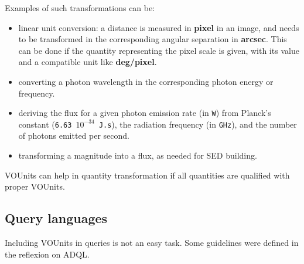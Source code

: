 \documentclass[11pt,notitlepage,onecolumn]{ivoa}
\newcommand{\unit}[1]{\textbf{\textsf{\color{orange}#1}}}
\begin{document}
Examples of such transformations can be:
\begin{itemize}
\item linear unit conversion: a distance is measured in \unit{pixel} in an image, and needs to be transformed in
the corresponding angular separation in \unit{arcsec}. This can be done if the quantity representing the pixel
scale is given, with its value and a compatible unit like \unit{deg/pixel}.
\item converting a photon wavelength in the corresponding photon energy or frequency.
\item deriving the flux for a given photon emission rate (in \texttt{W}) from Planck's
constant (\texttt{6.63 $10^{-34}$ J.s}), the radiation frequency (in \texttt{GHz}), and the
number of photons emitted per second.
\item transforming a magnitude into a flux, as needed for SED building.
\end{itemize}

VOUnits can help in quantity transformation if all quantities are qualified with proper VOUnits.

\subsection{Query languages}

Including VOUnits in queries is not an easy task. Some guidelines were defined in the
reflexion on ADQL.
\end{document}
